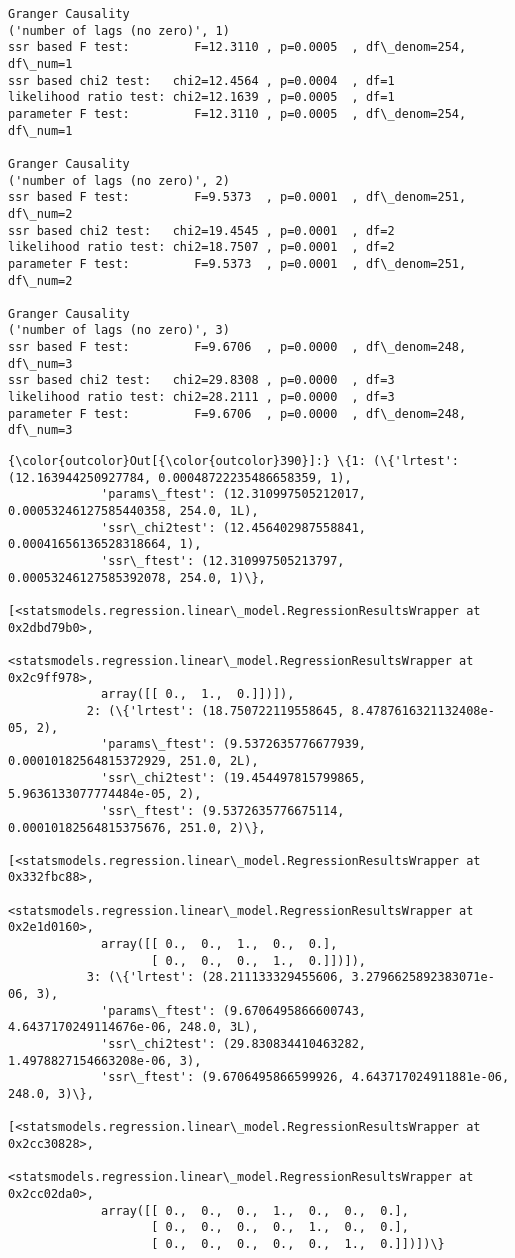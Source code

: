 \documentclass{article}
\begin{document}
    \begin{Verbatim}[commandchars=\\\{\}]
Granger Causality
('number of lags (no zero)', 1)
ssr based F test:         F=12.3110 , p=0.0005  , df\_denom=254, df\_num=1
ssr based chi2 test:   chi2=12.4564 , p=0.0004  , df=1
likelihood ratio test: chi2=12.1639 , p=0.0005  , df=1
parameter F test:         F=12.3110 , p=0.0005  , df\_denom=254, df\_num=1

Granger Causality
('number of lags (no zero)', 2)
ssr based F test:         F=9.5373  , p=0.0001  , df\_denom=251, df\_num=2
ssr based chi2 test:   chi2=19.4545 , p=0.0001  , df=2
likelihood ratio test: chi2=18.7507 , p=0.0001  , df=2
parameter F test:         F=9.5373  , p=0.0001  , df\_denom=251, df\_num=2

Granger Causality
('number of lags (no zero)', 3)
ssr based F test:         F=9.6706  , p=0.0000  , df\_denom=248, df\_num=3
ssr based chi2 test:   chi2=29.8308 , p=0.0000  , df=3
likelihood ratio test: chi2=28.2111 , p=0.0000  , df=3
parameter F test:         F=9.6706  , p=0.0000  , df\_denom=248, df\_num=3
    \end{Verbatim}

            \begin{Verbatim}[commandchars=\\\{\}]
{\color{outcolor}Out[{\color{outcolor}390}]:} \{1: (\{'lrtest': (12.163944250927784, 0.00048722235486658359, 1),
             'params\_ftest': (12.310997505212017, 0.00053246127585440358, 254.0, 1L),
             'ssr\_chi2test': (12.456402987558841, 0.00041656136528318664, 1),
             'ssr\_ftest': (12.310997505213797, 0.00053246127585392078, 254.0, 1)\},
            [<statsmodels.regression.linear\_model.RegressionResultsWrapper at 0x2dbd79b0>,
             <statsmodels.regression.linear\_model.RegressionResultsWrapper at 0x2c9ff978>,
             array([[ 0.,  1.,  0.]])]),
           2: (\{'lrtest': (18.750722119558645, 8.4787616321132408e-05, 2),
             'params\_ftest': (9.5372635776677939, 0.00010182564815372929, 251.0, 2L),
             'ssr\_chi2test': (19.454497815799865, 5.9636133077774484e-05, 2),
             'ssr\_ftest': (9.5372635776675114, 0.00010182564815375676, 251.0, 2)\},
            [<statsmodels.regression.linear\_model.RegressionResultsWrapper at 0x332fbc88>,
             <statsmodels.regression.linear\_model.RegressionResultsWrapper at 0x2e1d0160>,
             array([[ 0.,  0.,  1.,  0.,  0.],
                    [ 0.,  0.,  0.,  1.,  0.]])]),
           3: (\{'lrtest': (28.211133329455606, 3.2796625892383071e-06, 3),
             'params\_ftest': (9.6706495866600743, 4.6437170249114676e-06, 248.0, 3L),
             'ssr\_chi2test': (29.830834410463282, 1.4978827154663208e-06, 3),
             'ssr\_ftest': (9.6706495866599926, 4.643717024911881e-06, 248.0, 3)\},
            [<statsmodels.regression.linear\_model.RegressionResultsWrapper at 0x2cc30828>,
             <statsmodels.regression.linear\_model.RegressionResultsWrapper at 0x2cc02da0>,
             array([[ 0.,  0.,  0.,  1.,  0.,  0.,  0.],
                    [ 0.,  0.,  0.,  0.,  1.,  0.,  0.],
                    [ 0.,  0.,  0.,  0.,  0.,  1.,  0.]])])\}
\end{Verbatim}
        
\end{document}
